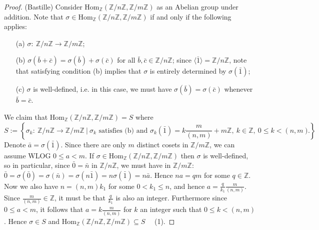 \documentclass[10pt]{article}
\newcommand{\Z}{\mathbb{Z}}
\newcommand{\la}{\langle}
\newcommand{\ra}{\rangle}
\begin{document}
\begin{itemize}
\begin{proof} (Bastille) Consider $\text{Hom}_{\Z}(\Z/n\Z,\Z/m\Z)$ as an Abelian group under addition. Note that $\sigma \in \text{Hom}_{\Z}(\Z/n\Z,\Z/m\Z)$ if and only if the following applies:
\begin{enumerate}
\item[(a)] $\sigma: \ \Z/n\Z \to \Z/m\Z$;
\item[(b)] $\sigma(\bar{b}+\bar{c})=\sigma(\bar{b})+\sigma(\bar{c})$ for all $\bar{b}, \bar{c} \in \Z/n\Z$; since $\la \bar{1} \ra=\Z/n\Z$, note that satisfying condition (b) implies that $\sigma$ is entirely determined by $\sigma(\bar{1})$;
\item[(c)] $\sigma$ is well-defined, i.e. in this case, we must have $\sigma(\bar{b})=\sigma(\bar{c})$ whenever $\bar{b}=\bar{c}$.
\end{enumerate}
We claim that $\text{Hom}_{\Z}(\Z/n\Z,\Z/m\Z)=S$ where
$$S:=\left\{\sigma_k: \ \Z/n\Z \to \Z/m\Z \ | \ \sigma_k \text{ satisfies (b) and } \sigma_k(\bar{1})=k\dfrac{m}{(n,m)}+m\Z , \ k\in \Z, \ 0 \leq k < (n,m) \right\}.$$
Denote $\bar{a}=\sigma(\bar{1})$. Since there are only $m$ distinct cosets in $\Z/m\Z$, we can assume WLOG $0 \leq a <m$. If $\sigma \in \text{Hom}_{\Z}(\Z/n\Z,\Z/m\Z)$ then $\sigma$ is well-defined, so in particular, since $\bar{0}=\bar{n}$ in $\Z/n\Z$, we must have in $\Z/m\Z$: $\bar{0}=\sigma(\bar{0})=\sigma(\bar{n})=\sigma(n\bar{1})=n\sigma(\bar{1})=n\bar{a}.$ Hence $na=qm$ for some $q \in \Z$. Now we also have $n=(n,m)k_1$ for some $0 < k_1 \leq n$, and hence $a= \frac{q}{k_1}\frac{m}{(n,m)}$. Since $\frac{m}{(n,m)} \in \Z$, it must be that $\frac{q}{k_1}$ is also an integer. Furthermore since $0 \leq a < m$, it follows that $a=k\frac{m}{(n,m)}$ for $k$ an integer such that $0 \leq k <(n,m)$. Hence $\sigma \in S$ and $\text{Hom}_{\Z}(\Z/n\Z,\Z/m\Z) \subseteq S$ \ \ (1).


\end{proof}
\end{itemize}
\end{document}
